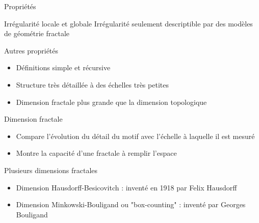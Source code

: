 \documentclass{beamer}
\begin{document}
\begin{frame}{Propriétés}
\begin{block}{Irrégularité locale et globale}
    Irrégularité seulement descriptible par des modèles de géométrie fractale
\end{block}


\begin{block}{Autres propriétés}
    \begin{itemize}
        \item Définitions simple et récursive
        \item Structure très détaillée à des échelles très petites
        \item Dimension fractale plus grande que la dimension topologique
    \end{itemize}
\end{block}
\end{frame}

\begin{frame}{Dimension fractale}
\begin{block}{}
    \begin{itemize}
        \item Compare l'évolution du détail du motif avec l'échelle à laquelle il est mesuré
        \item Montre la capacité d'une fractale à remplir l'espace
    \end{itemize}
\end{block}

\begin{block}{Plusieurs dimensions fractales}
    \begin{itemize}
        \item Dimension Hausdorff-Besicovitch : inventé en 1918 par Felix Hausdorff
        \item Dimension Minkowski-Bouligand ou "box-counting" : inventé par Georges Bouligand
    \end{itemize}
\end{block}
\end{frame}
\end{document}
